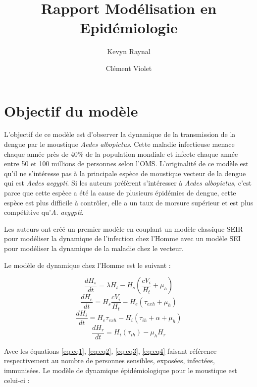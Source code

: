 \documentclass[
  12pt,
  french,
  oneside]{article}
\title{Rapport Modélisation en Epidémiologie}
\author{Kevyn Raynal \and Clément Violet}
\date{}
\begin{document}
\maketitle

\hypertarget{objectif-du-moduxe8le}{%
\section{Objectif du modèle}\label{objectif-du-moduxe8le}}

L'objectif de ce modèle est d'observer la dynamique de la transmission
de la dengue par le moustique \emph{Aedes albopictus}. Cette maladie
infectieuse menace chaque année près de 40\% de la population mondiale
et infecte chaque année entre 50 et 100 millions de personnes selon
l'OMS. L'originalité de ce modèle est qu'il ne s'intéresse pas à la
principale espèce de moustique vecteur de la dengue qui est \emph{Aedes
aegypti}. Si les auteurs préfèrent s'intéresser à \emph{Aedes
albopictus}, c'est parce que cette espèce a été la cause de plusieurs
épidémies de dengue, cette espèce est plus difficile à contrôler, elle a
un taux de morsure supérieur et est plus compétitive qu'\emph{A.
aegypti}.

Les auteurs ont créé un premier modèle en couplant un modèle classique
SEIR pour modéliser la dynamique de l'infection chez l'Homme avec un
modèle SEI pour modéliser la dynamique de la maladie chez le vecteur.

Le modèle de dynamique chez l'Homme est le suivant :

\begin{equation} \frac{dH_s}{dt} = \lambda H_t - H_s \left(\frac{cV_i}{H_t} + \mu_h\right)\label{eq:eq1}\end{equation}
\begin{equation} \frac{dH_e}{dt} = H_s \frac{cV_i}{H_t} - H_e (\tau_{exh} + \mu_h)\label{eq:eq2}\end{equation}
\begin{equation} \frac{dH_i}{dt} = H_e\tau_{exh} - H_i\left(\tau_{ih} + \alpha + \mu_h\right)\label{eq:eq3}\end{equation}
\begin{equation} \frac{dH_r}{dt} = H_i\left(\tau_{ih}\right) - \mu_h H_r\label{eq:eq4}\end{equation}

Avec les équations \ref{eq:eq1}, \ref{eq:eq2}, \ref{eq:eq3},
\ref{eq:eq4} faisant référence respectivement au nombre de personnes
sensibles, exposées, infectées, immunisées. Le modèle de dynamique
épidémiologique pour le moustique est celui-ci :
\end{document}
